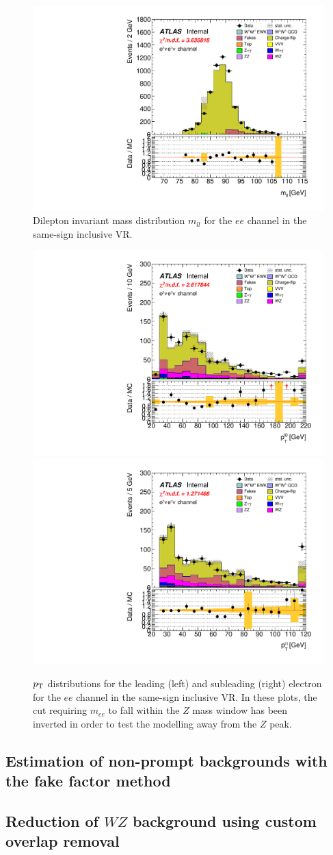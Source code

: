 \begin{figure}
  \centering
  \includegraphics[width=.48\textwidth]{figs/ssww_13tev/backgrounds/charge_flip/ee-CutCRInclusiveSSZ-Mll_Zpeak-lin}
  \caption{Dilepton invariant mass distribution $m_{ll}$ for the $ee$ channel in the same-sign inclusive VR.}
  \label{fig:ssww13tev_ssincl_mll}
\end{figure}

\begin{figure}
  \centering
  \includegraphics[width=.48\textwidth]{figs/ssww_13tev/backgrounds/charge_flip/ee-CutCRInclusiveSSZVeto-l0_pt-lin.pdf}
  \includegraphics[width=.48\textwidth]{figs/ssww_13tev/backgrounds/charge_flip/ee-CutCRInclusiveSSZVeto-l1_pt-lin.pdf}
  \caption{$p_{\mathrm{T}}$ distributions for the leading (left) and subleading (right) electron for the $ee$ channel in the same-sign inclusive VR.  In these plots, the cut requiring $m_{ee}$ to fall within the $Z$ mass window has been inverted in order to test the modelling away from the $Z$ peak.}
  \label{fig:ssww13tev_ssincl_ptlep}
\end{figure}

\subsection{Estimation of non-prompt backgrounds with the fake factor method}\label{ssww13tev:fake_factor}


\subsection{Reduction of $WZ$ background using custom overlap removal}\label{ssww13tev:custom_or}

